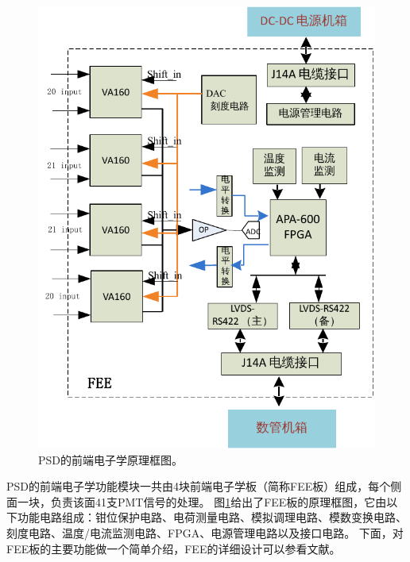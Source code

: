 \begin{figure}[htb]
	\centering
	\includegraphics[width=0.7\linewidth]{chap/description/fig/psd_fee1}
	\caption{PSD的前端电子学原理框图。}
	\label{fig:description:psd_fee1}
\end{figure}
PSD的前端电子学功能模块一共由4块前端电子学板（简称FEE板）组成，每个侧面一块，负责该面41支PMT信号的处理。
图\ref{fig:description:psd_fee1}给出了FEE板的原理框图，它由以下功能电路组成：钳位保护电路、电荷测量电路、模拟调理电路、模数变换电路、刻度电路、温度/电流监测电路、FPGA、电源管理电路以及接口电路。
下面，对FEE板的主要功能做一个简单介绍，FEE的详细设计可以参看文献\parencite{yanghaibo_thesis,psd_tdr}。


